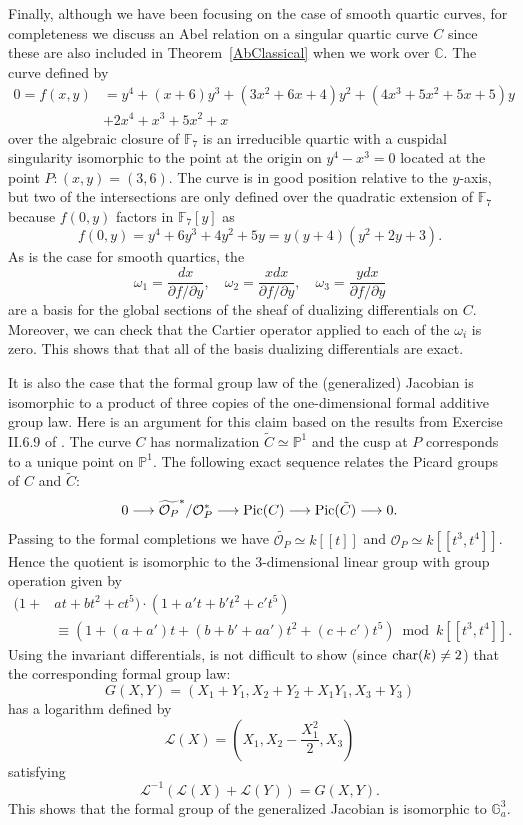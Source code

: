 \documentclass[12pt]{amsart}
\theoremstyle{theorem}
\newcommand{\FF}{\mathbb{F}}
\newcommand{\PP}{\mathbb{P}}
\newcommand{\CC}{\mathbb{C} }
\begin{document}
Finally, although we have been focusing on the case of smooth quartic curves, for completeness
we discuss an Abel relation on a singular quartic curve $C$ since these are also included in Theorem~\ref{AbClassical}
when we work over $\CC$.  The curve defined by 
\begin{align*}
0 = f(x,y) &= y^4 + (x + 6) y^3 + (3x^2 + 6x + 4) y^2 + (4 x^3 + 5 x^2 + 5 x + 5) y \\
&+ 2 x^4 + x^3 + 5 x^2 + x
\end{align*}
over the algebraic closure of $\FF_7$ is an irreducible quartic with a cuspidal singularity isomorphic
to the point at the origin on $y^4 - x^3 = 0$ located at the point $P: (x,y) = (3,6)$.  The curve is in 
good position relative to the $y$-axis, but two of the intersections are only defined over the quadratic
extension of $\FF_7$ because $f(0,y)$ factors in $\FF_7[y]$ as
$$f(0,y) = y^4 + 6y^3 + 4 y^2 + 5y = y(y+4)(y^2 + 2y + 3).$$
As is the case for smooth quartics, the 
$$\omega_1 = \frac{dx}{\partial f/\partial y}, \quad \omega_2 = \frac{x dx}{\partial f/\partial y}, \quad \omega_3 = \frac{y dx}{\partial f/\partial y}$$
are a basis for the global sections of the sheaf of dualizing differentials on $C$.
Moreover, we can check that the Cartier operator applied to each of the $\omega_i$ is zero.  This shows that 
that all of the basis dualizing differentials are exact.

It is also the case that  the formal group law of the (generalized) Jacobian
is isomorphic to a product of three copies of the one-dimensional formal additive group law.   Here is an argument for 
this claim based on the results from Exercise II.6.9 of \cite{Har}.  The curve $C$ has normalization $\tilde{C} \simeq \PP^1$ and
the cusp at $P$ corresponds to a unique point on $\PP^1$.
The following exact sequence relates the Picard groups of $C$ and $\tilde{C}$:
$$0 \longrightarrow \widetilde{\mathcal{O}_P}^*/\mathcal{O}_P^* \longrightarrow {\rm Pic}(C) \longrightarrow {\rm Pic}(\tilde{C}) \longrightarrow 0.$$
Passing to the formal completions we have $\widetilde{\mathcal{O}_P} \simeq k[[t]]$ and $\mathcal{O}_P \simeq k[[t^3,t^4]]$.  Hence the quotient
is isomorphic to the $3$-dimensional linear group with group operation given by 
\begin{align*}
(1 + & a t + b t^2 + c t^5) \cdot (1 + a' t + b' t^2 + c' t^5) \\
&\equiv (1 + (a + a') t + (b + b' + a a') t^2 + (c + c') t^5) \bmod k[[t^3,t^4]].
\end{align*}
Using the invariant differentials, is not difficult to show (since ${\rm char}(k) \ne 2$) that the corresponding formal group law:
$$G(X,Y) = (X_1 + Y_1, X_2 + Y_2 + X_1 Y_1, X_3 + Y_3)$$
has a logarithm defined by 
$$\mathcal{L}(X) = (X_1, X_2 - \frac{X_1^2}{2}, X_3)$$
satisfying
$$\mathcal{L}^{-1}(\mathcal{L}(X) + \mathcal{L}(Y)) = G(X,Y).$$
This shows that the formal group of the generalized Jacobian is isomorphic to $\mathbb{G}_a^3$.  
\end{document}
